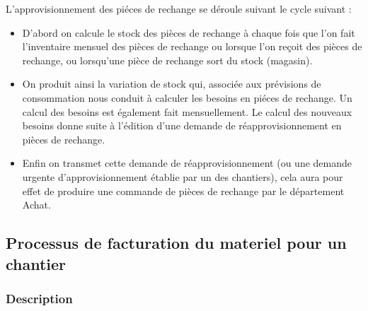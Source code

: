 						L'approvisionnement des piéces de rechange se déroule suivant le cycle suivant :
						\begin{itemize}
						    \item D'abord on calcule le stock des pièces de rechange à chaque fois que l'on fait l'inventaire mensuel des pièces de rechange ou lorsque l'on reçoit des pièces de rechange, ou lorsqu'une pièce de rechange sort du stock (magasin).
						    \item On produit ainsi la variation de stock qui, associée aux prévisions de consommation nous conduit à calculer les besoins en piéces de rechange. Un calcul des besoins est également fait mensuellement. Le calcul des nouveaux besoins donne suite à l'édition d'une demande de réapprovisionnement en pièces de rechange.
						    \item Enfin on transmet cette demande de réapprovisionnement (ou une demande urgente d'approvisionnement
établie par un des chantiers), cela aura pour effet de produire une commande de pièces de rechange par le département Achat.
						\end{itemize}
						
				
				
				
		\subsection{Processus de facturation du materiel pour un chantier}
				\subsubsection{Description}
				
